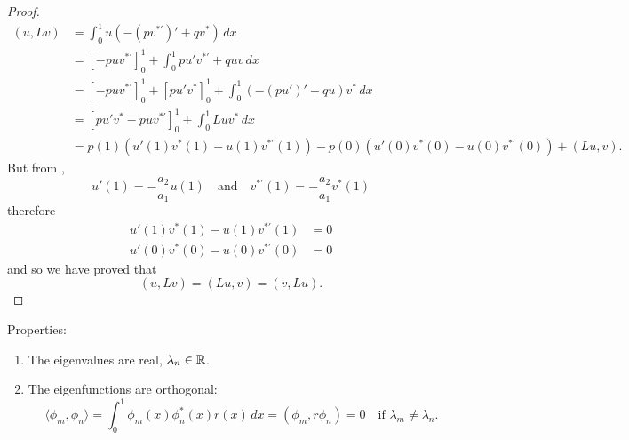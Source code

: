 \begin{proof}
	\begin{align*}
		(u, Lv) &= \int_0^1 u\left(-(pv^{*\prime})' + qv^*\right) \,dx \\
		&= \left[-puv^{*\prime}\right]_0^1 + \int_0^1 pu'v^{*\prime} + quv \,dx \\
		&= \left[-puv^{*\prime}\right]_0^1 + \left[pu'v^*\right]_0^1 + \int_0^1 (-(pu')' + qu)v^* \,dx \\
		&= \left[pu'v^*-puv^{*\prime}\right]_0^1 + \int_0^1 Luv^* \,dx \\
		&= p(1)\left(u'(1)v^*(1) - u(1)v^{*\prime}(1)\right) - p(0)\left(u'(0)v^*(0) - u(0)v^{*\prime}(0)\right) + (Lu, v).
	\end{align*}
	But from ,
	\[
	u'(1) = -\frac{a_2}{a_1}u(1) \quad\text{and}\quad v^{*\prime}(1) = -\frac{a_2}{a_1}v^*(1)
	\]
	therefore
	\begin{align*}
		u'(1)v^*(1) - u(1)v^{*\prime}(1) &= 0 \\
		u'(0)v^*(0) - u(0)v^{*\prime}(0) &= 0
	\end{align*}
	and so we have proved that
	\[
	(u, Lv) = (Lu, v) = (v, Lu).
	\]
\end{proof}

Properties:
\begin{enumerate}
	\item The eigenvalues are real, $\lambda_n \in \mathbb{R}$.
	\item The eigenfunctions are orthogonal:
	\[
	\langle \phi_m, \phi_n \rangle = \int_0^1 \phi_m(x)\phi_n^*(x)r(x) \,dx = (\phi_m, r\phi_n) = 0 \quad \text{if } \lambda_m \neq \lambda_n.
	\]
\end{enumerate}

